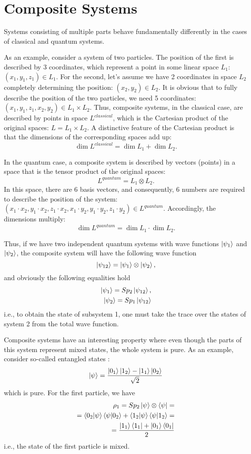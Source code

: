 \section{Composite Systems}
\label{sec:add:quantum:composite}
Systems consisting of multiple parts behave fundamentally differently in the cases of classical and quantum systems.

As an example, consider a system of two particles. The position of the first is described by 3 coordinates, which represent a point in some linear space $L_1$: $(x_1, y_1, z_1) \in L_1$. For the second, let's assume we have 2 coordinates in space $L_2$ completely determining the position:  
$(x_2, y_2) \in L_2$. It is obvious that to fully describe the position of the two particles, we need 5 coordinates: $(x_1, y_1, z_1, x_2, y_2) \in L_1 \times L_2$. Thus, composite systems, in the classical case, are described by points in space $L^{classical}$, which is the Cartesian product of the original spaces: $L = L_1 \times L_2$. A distinctive feature of the Cartesian product is that the dimensions of the corresponding spaces add up:
\[
\dim{L^{classical}} = \dim{L_1} + \dim{L_2}.
\] 

In the quantum case, a composite system is described by vectors (points) in a space that is the tensor product of the original spaces: 
\[
L^{quantum} = L_1 \otimes L_2.
\]
In this space, there are 6 basis vectors, and consequently, 6 numbers are required to describe the position of the system:
$(x_1 \cdot x_2, y_1 \cdot x_2, z_1 \cdot x_2, 
x_1 \cdot y_2, y_1 \cdot y_2, z_1 \cdot y_2) \in L^{quantum}$. 
Accordingly, the dimensions multiply:
\[
\dim{L^{quantum}} = \dim{L_1} \cdot \dim{L_2}.
\] 

Thus, if we have two independent quantum systems with wave functions $\ket{\psi_1}$ and $\ket{\psi_2}$, the composite system will have the following wave function
\[
\ket{\psi_{12}} = \ket{\psi_1} \otimes \ket{\psi_2},
\]
and obviously the following equalities hold
\begin{eqnarray}
\ket{\psi_1} = Sp_2 \ket{\psi_{12}}, \\
\nonumber
\ket{\psi_2} = Sp_1 \ket{\psi_{12}} 
\nonumber
\end{eqnarray}
i.e., to obtain the state of subsystem 1, one must take the trace over the states of system 2 from the total wave function.

Composite systems have an interesting property where even though the parts of this system represent mixed states, the whole system is pure. As an example, consider so-called entangled states :
\[
\ket{\psi} = \frac{\ket{0_1}\ket{1_2} - \ket{1_1}\ket{0_2}}{\sqrt{2}}
\]
which is pure. For the first particle, we have
\begin{eqnarray}
\rho_1 = Sp_2 \ket{\psi} \otimes \bra{\psi} = 
\nonumber \\
=
\bra{0_2}\ket{\psi}\bra{\psi}\ket{0_2} + 
\bra{1_2}\ket{\psi}\bra{\psi}\ket{1_2} = 
\nonumber \\
= \frac{\ket{1_1}\bra{1_1} + 
\ket{0_1}\bra{0_1}}{2}
\nonumber
\end{eqnarray}
i.e., the state of the first particle is mixed.